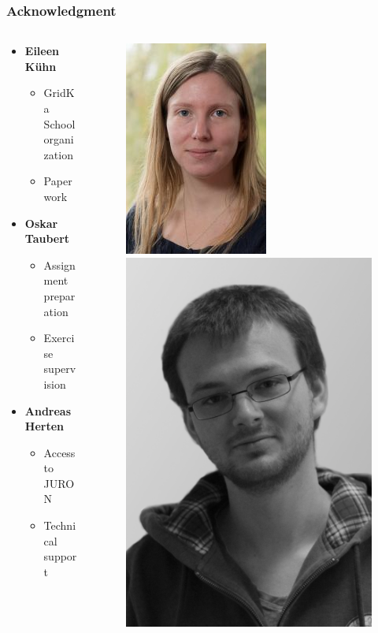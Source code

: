 \documentclass[aspectratio=169]{beamer}
\begin{document}
\begin{frame}
\frametitle{Acknowledgment}

\begin{columns}
    \begin{column}{0.48\textwidth}
        \begin{itemize}
            \item \textbf{Eileen Kühn}
            \begin{itemize}
                \item GridKa School organization
                \item Paperwork
            \end{itemize}
            \item \textbf{Oskar Taubert}
            \begin{itemize}
                \item Assignment preparation
                \item Exercise supervision
            \end{itemize}
            \item \textbf{Andreas Herten}
            \begin{itemize}
                \item Access to JURON
                \item Technical support
            \end{itemize}
        \end{itemize}
    \end{column}

    \begin{column}{0.48\textwidth}
        \begin{figure}
            \includegraphics[width=0.25\linewidth]{eileen.jpg}\quad \includegraphics[width=0.25\linewidth]{oskar.jpg} \\\medskip
            

\end{figure}
\end{column}
\end{columns}
\end{frame}
\end{document}
